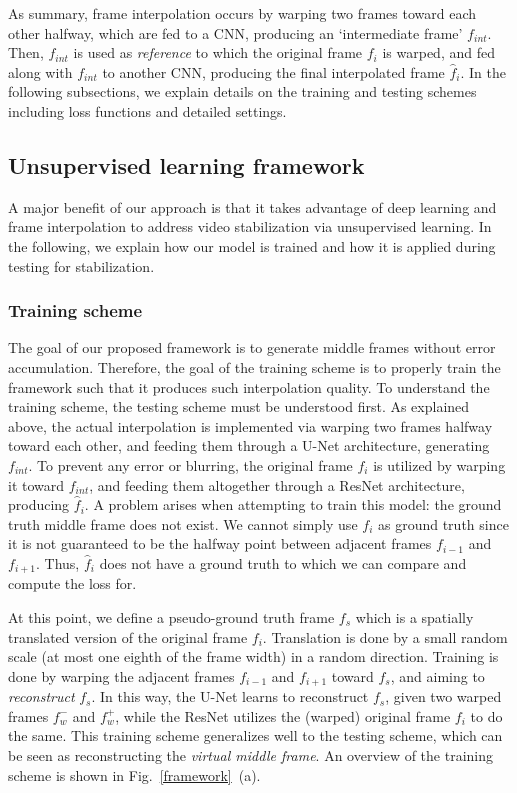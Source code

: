 As summary, frame interpolation occurs by warping two frames toward each other halfway, which are fed to a CNN, producing an `intermediate frame' $f_{int}$.
Then, $f_{int}$ is used as \emph{reference} to which the original frame $f_i$ is warped, and fed along with $f_{int}$ to another CNN, producing the final interpolated frame $\hat{f}_i$.
In the following subsections, we explain details on the training and testing schemes including loss functions and detailed settings.

\subsection{Unsupervised learning framework}
A major benefit of our approach is that it takes advantage of deep learning and frame interpolation to address video stabilization via unsupervised learning.
In the following, we explain how our model is trained and how it is applied during testing for stabilization.

\subsubsection{\textbf{Training scheme}}
The goal of our proposed framework is to generate middle frames without error accumulation.
Therefore, the goal of the training scheme is to properly train the framework such that it produces such interpolation quality.
To understand the training scheme, the testing scheme must be understood first.
As explained above, the actual interpolation is implemented via warping two frames halfway toward each other, and feeding them through a U-Net architecture, generating $f_{int}$.
To prevent any error or blurring, the original frame $f_i$ is utilized by warping it toward $f_{int}$, and feeding them altogether through a ResNet architecture, producing $\hat{f}_i$.
A problem arises when attempting to train this model: the ground truth middle frame does not exist.
We cannot simply use $f_i$ as ground truth since it is not guaranteed to be the halfway point between adjacent frames $f_{i-1}$ and $f_{i+1}$.
Thus, $\hat{f}_i$ does not have a ground truth to which we can compare and compute the loss for.

At this point, we define a pseudo-ground truth frame $f_s$ which is a spatially translated version of the original frame $f_i$.
Translation is done by a small random scale (at most one eighth of the frame width) in a random direction.
Training is done by warping the adjacent frames $f_{i-1}$ and $f_{i+1}$ toward $f_s$, and aiming to \emph{reconstruct} $f_s$.
In this way, the U-Net learns to reconstruct $f_s$, given two warped frames $f_w^-$ and $f_w^+$, while the ResNet utilizes the (warped) original frame $f_i$ to do the same.
This training scheme generalizes well to the testing scheme, which can be seen as reconstructing the \emph{virtual middle frame}.
An overview of the training scheme is shown in Fig.~\ref{framework}~(a).


